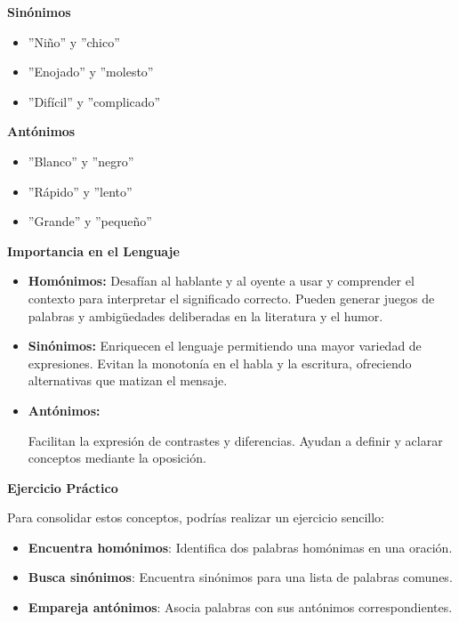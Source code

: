 \textbf{Sinónimos}

\begin{itemize}
      \item ''Niño'' y ''chico''
      \item ''Enojado'' y ''molesto''
      \item ''Difícil'' y ''complicado''
\end{itemize}

\textbf{Antónimos}

\begin{itemize}
      \item ''Blanco'' y ''negro''
      \item ''Rápido'' y ''lento''
      \item ''Grande'' y ''pequeño''
\end{itemize}

\textbf{Importancia en el Lenguaje}

\begin{itemize}
      \item \textbf{Homónimos:} Desafían al hablante y al oyente a usar y comprender el contexto para interpretar el significado correcto.
            Pueden generar juegos de palabras y ambigüedades deliberadas en la literatura y el humor.
      \item \textbf{Sinónimos:} Enriquecen el lenguaje permitiendo una mayor variedad de expresiones.
            Evitan la monotonía en el habla y la escritura, ofreciendo alternativas que matizan el mensaje.
      \item \textbf{Antónimos:}

            Facilitan la expresión de contrastes y diferencias.
            Ayudan a definir y aclarar conceptos mediante la oposición.
\end{itemize}

\textbf{Ejercicio Práctico}

Para consolidar estos conceptos, podrías realizar un ejercicio sencillo:

\begin{itemize}
      \item \textbf{Encuentra homónimos}: Identifica dos palabras homónimas en una oración.
      \item \textbf{Busca sinónimos}: Encuentra sinónimos para una lista de palabras comunes.
      \item \textbf{Empareja antónimos}: Asocia palabras con sus antónimos correspondientes.
\end{itemize}

